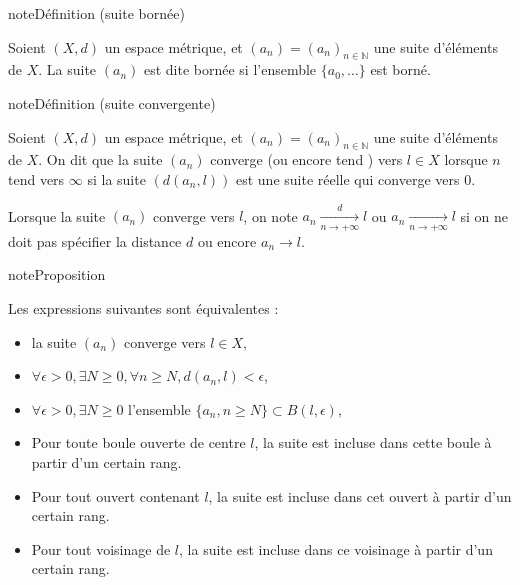 \documentclass[letterpaper,10pt,french]{sphinxmanual}
\begin{document}
\begin{sphinxadmonition}{note}{Définition (suite bornée)}

\sphinxAtStartPar
Soient \((X, d)\) un espace métrique, et \((a_n)=(a_n)_{n \in \mathbb N}\) une suite d’éléments de \(X\).
La suite \((a_n)\) est dite bornée si l’ensemble \(\{a_0, \ldots\}\) est borné.
\end{sphinxadmonition}

\begin{sphinxadmonition}{note}{Définition (suite convergente)}

\sphinxAtStartPar
Soient \((X, d)\) un espace métrique, et \((a_n)=(a_n)_{n \in \mathbb N}\) une suite d’éléments de \(X\).
On dit que la suite \((a_n)\) converge (ou encore tend ) vers \(l \in X\) lorsque \(n\) tend vers \(\infty\) si la suite \((d(a_n, l))\) est une suite réelle qui converge vers 0.
\end{sphinxadmonition}

\sphinxAtStartPar
Lorsque la suite \((a_n)\) converge vers \(l \), on note \(a_n \underset{n \to +\infty}{\overset{d}{\longrightarrow}}l\) ou \(a_n \underset{n \to +\infty}{{\longrightarrow}}l\) si on ne doit pas spécifier la distance \(d\) ou encore \(a_n \longrightarrow l\).

\begin{sphinxadmonition}{note}{Proposition}

\sphinxAtStartPar
Les expressions suivantes sont équivalentes :
\begin{itemize}
\item {} 
\sphinxAtStartPar
la suite \((a_n)\) converge vers \(l \in X\),

\item {} 
\sphinxAtStartPar
\(\forall \epsilon > 0, \exists N \geq 0, \forall n \geq N, d(a_n, l) <\epsilon\),

\item {} 
\sphinxAtStartPar
\(\forall \epsilon > 0, \exists N \geq 0\) l’ensemble \(\{a_n, n \geq N\} \subset B(l, \epsilon)\),

\item {} 
\sphinxAtStartPar
Pour toute boule ouverte de centre \(l\), la suite est incluse dans cette boule à partir d’un certain rang.

\item {} 
\sphinxAtStartPar
Pour tout ouvert contenant \(l\), la suite est incluse dans cet ouvert à partir d’un certain rang.

\item {} 
\sphinxAtStartPar
Pour tout voisinage de \(l\), la suite est incluse dans ce voisinage à partir d’un certain rang.

\end{itemize}
\end{sphinxadmonition}
\end{document}
